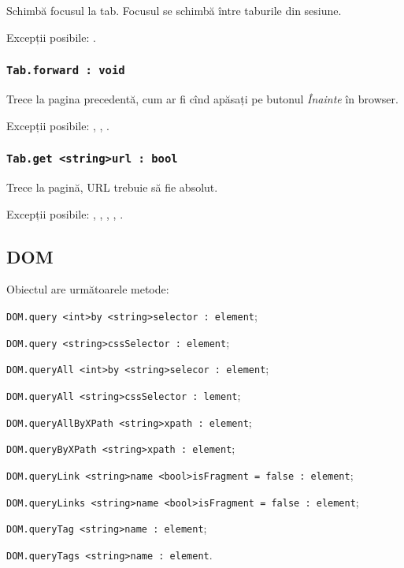 Schimbă focusul la tab. Focusul se schimbă între taburile din sesiune.

Excepții posibile: .

\subsubsection{\lstinline|Tab.forward : void|}

Trece la pagina precedentă, cum ar fi cînd apăsați pe butonul \textit{Înainte} în browser.


Excepții posibile: , , .

\subsubsection{\lstinline|Tab.get <string>url : bool|}

Trece la pagină, URL trebuie să fie absolut.

Excepții posibile: , , , , .

\subsection{{\color{orange} DOM}}

Obiectul \dom{} are următoarele metode:
\begin{icItems}
	\item \lstinline|DOM.query <int>by <string>selector : element|;
	\item \lstinline|DOM.query <string>cssSelector : element|;
	\item \lstinline|DOM.queryAll <int>by <string>selecor : element|;
	\item \lstinline|DOM.queryAll <string>cssSelector : lement|;
	\item \lstinline|DOM.queryAllByXPath <string>xpath : element|;
	\item \lstinline|DOM.queryByXPath <string>xpath : element|;
	\item \lstinline|DOM.queryLink <string>name <bool>isFragment = false : element|;
	\item \lstinline|DOM.queryLinks <string>name <bool>isFragment = false : element|;
	\item \lstinline|DOM.queryTag <string>name : element|;
	\item \lstinline|DOM.queryTags <string>name : element|.
\end{icItems}

